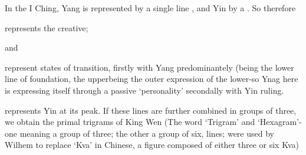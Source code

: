 \documentclass[11pt]{book}
\begin{document}
In the I Ching, Yang is represented by a single line , and Yin by a . So therefore  represents the creative;  and  represent states of transition, firstly with Yang predominantely (being the lower line of foundation, the upperbeing the outer expression of the lower-so Ynag here is expressing itself through a passive `personality' secondally with Yin ruling.  represents Yin at its peak. If these lines are further combined in groups of three, we obtain the primal trigrams of King Wen (The word `Trigram' and `Hexagram'-one meaning a group of three; the other a group of six, lines; were used by Wilhem to replace `Kva' in Chinese, a figure composed of either three or six Kva)
\end{document}
